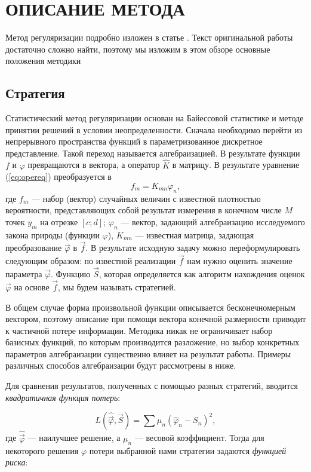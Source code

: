 \chapter{ОПИСАНИЕ МЕТОДА}

Метод регуляризации подробно изложен в статье \cite{turchin}. Текст оригинальной работы достаточно сложно найти, поэтому мы изложим в этом обзоре основные положения методики

\section{Стратегия}
Статистический метод регуляризации основан на Байессовой статистике и методе принятии решений в условии неопределенности. Сначала необходимо перейти из непрерывного пространства функций в параметризованное дискретное представление. Такой переход называется алгебраизацией. В результате функции $f$ и $\varphi$ превращаются в вектора, а оператор $\hat{K}$ в матрицу. В результате уравнение (\ref{eq:opereq}) преобразуется в
\begin{equation}
  f_m = K_{mn}\varphi_n,
\label{eq:algebr}
\end{equation}
где $f_m$ --- набор (вектор) случайных величин с известной плотностью вероятности, представляющих собой результат измерения в конечном числе $M$ точек $y_m$ на отрезке $[c;d]$; $\varphi_n$ --- вектор, задающий алгебраизацию исследуемого закона природы (функции $\varphi$), $K_{mn}$ --- известная матрица, задающая преобразование $\vec{\varphi}$ в  $\vec{f}$.
В результате исходную задачу можно переформулировать следующим образом: по известной реализации $\vec{f}$ нам нужно оценить значение параметра $\vec{\varphi}$. Функцию $\vec{S}$, которая определяется как алгоритм нахождения оценок $\vec{\varphi}$ на основе $\vec{f}$, мы будем называть стратегией. 

В общем случае форма произвольной функции описывается бесконечномерным вектором, поэтому описание при помощи вектора конечной размерности приводит к частичной потере информации. Методика никак не ограничивает набор базисных функций, по которым производится разложение, но выбор конкретных параметров алгебраизации существенно влияет на результат работы. Примеры различных способов алгебраизации будут рассмотрены в ниже.

Для сравнения результатов, полученных с помощью разных стратегий, вводится \textit{квадратичная функция потерь}:

\begin{equation}
	L(\hat{\vec{\varphi}},\vec{S}) = \sum\mu_n(\hat{\varphi}_n-S_n)^2,
\end{equation}
где $\hat{\vec{\varphi}}$ --- наилучшее решение, а $\mu_n$ --- весовой коэффициент. Тогда для некоторого решения $\varphi$ потери выбранной нами стратегии задаются \textit{функцией риска}:

